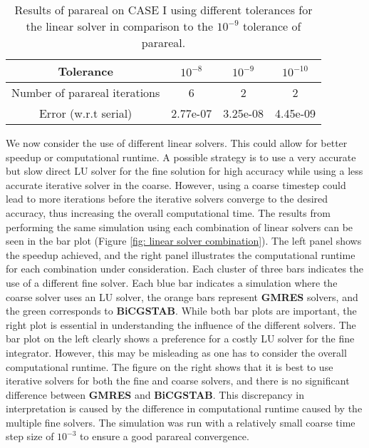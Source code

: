 \begin{table}[htbp]
    \centering
    \label{tab:tolerance_lin_solver}
    \begin{tabular}{|c|c|c|c|}
        \hline
        \textbf{Tolerance}& $10^{-8}$ & $10^{-9}$ & $10^{-10}$ \\
        \hline
         Number of parareal iterations & 6 & 2 & 2 \\
         Error (w.r.t serial) & 2.77e-07 & 3.25e-08 & 4.45e-09 \\
        \hline
    \end{tabular}
    \caption{Results of parareal on CASE I using different tolerances for the linear solver in comparison to the $10^{-9}$ tolerance of parareal.  }
\end{table}

We now consider the use of different linear solvers. This could allow for better speedup or computational runtime. A possible strategy is to use a very accurate but slow direct LU solver for the fine solution for high accuracy while using a less accurate iterative solver in the coarse. However, using a coarse timestep could lead to more iterations before the iterative solvers converge to the desired accuracy, thus increasing the overall computational time. The results from performing the same simulation using each combination of linear solvers can be seen in the bar plot (Figure \ref{fig: linear solver combination}). The left panel shows the speedup achieved, and the right panel illustrates the computational runtime for each combination under consideration. Each cluster of three bars indicates the use of a different fine solver. Each blue bar indicates a simulation where the coarse solver uses an LU solver, the orange bars represent \textbf{GMRES} solvers, and the green corresponds to \textbf{BiCGSTAB}. While both bar plots are important, the right plot is essential in understanding the influence of the different solvers. The bar plot on the left clearly shows a preference for a costly LU solver for the fine integrator. However, this may be misleading as one has to consider the overall computational runtime. The figure on the right shows that it is best to use iterative solvers for both the fine and coarse solvers, and there is no significant difference between \textbf{GMRES} and \textbf{BiCGSTAB}. This discrepancy in interpretation is caused by the difference in computational runtime caused by the multiple fine solvers. The simulation was run with a relatively small coarse time step size of $10^{-3}$ to ensure a good parareal convergence.

